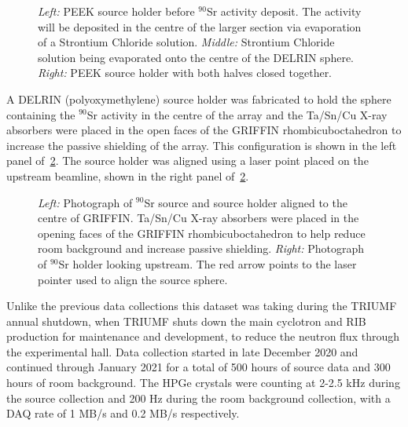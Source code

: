 \documentclass[cnatzke_thesis_proposal.tex]{subfiles}
\begin{document}

\begin{figure}[htbp]
  \centering
  \quad
  \quad
  \caption{
    \textit{Left:} PEEK source holder before $^{90}$Sr activity deposit. The activity will be deposited in the centre of the larger section via evaporation of a Strontium Chloride solution.
    \textit{Middle:} Strontium Chloride solution being evaporated onto the centre of the DELRIN sphere.
    \textit{Right:} PEEK source holder with both halves closed together.
  }
  \label{fig:source_holder}
\end{figure}

A DELRIN (polyoxymethylene) source holder was fabricated to hold the sphere containing the $^{90}$Sr activity in the centre of the array and the Ta/Sn/Cu X-ray absorbers were placed in the open faces of the GRIFFIN rhombicuboctahedron to increase the passive shielding of the array. This configuration is shown in the left panel of~\ref{fig:source_holder_in_griffin}. The source holder was aligned using a laser point placed on the upstream beamline, shown in the right panel of~\ref{fig:source_holder_in_griffin}.

\begin{figure}[htbp]
  \centering
  \quad
  \caption{
    \textit{Left:} Photograph of $^{90}$Sr source and source holder aligned to the centre of GRIFFIN. Ta/Sn/Cu X-ray absorbers were placed in the opening faces of the GRIFFIN rhombicuboctahedron to help reduce room background and increase passive shielding.
    \textit{Right:} Photograph of $^{90}$Sr holder looking upstream. The red arrow points to the laser pointer used to align the source sphere.
  }
  \label{fig:source_holder_in_griffin}
\end{figure}

Unlike the previous data collections this dataset was taking during the TRIUMF annual shutdown, when TRIUMF shuts down the main cyclotron and RIB production for maintenance and development, to reduce the neutron flux through the experimental hall. Data collection started in late December 2020 and continued through January 2021 for a total of 500 hours of source data and 300 hours of room background. The HPGe crystals were counting at 2-2.5 kHz during the source collection and 200 Hz during the room background collection, with a DAQ rate of 1 MB/s and 0.2 MB/s respectively.
\end{document}
